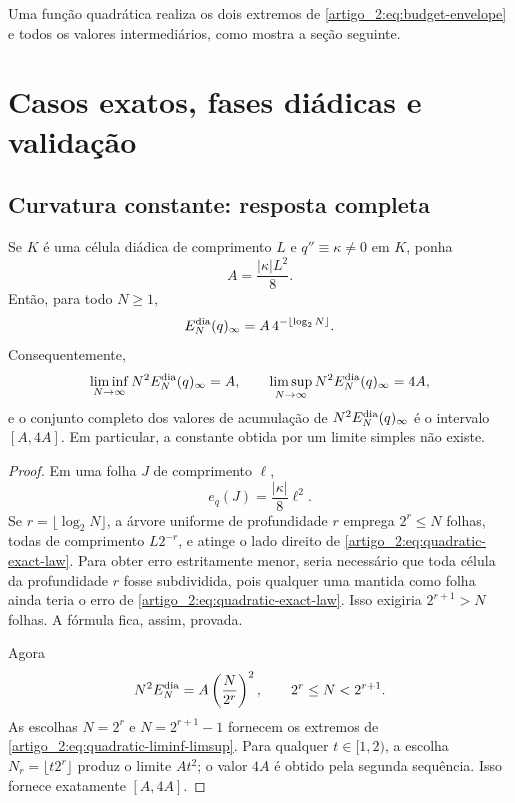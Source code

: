 Uma função quadrática realiza os dois extremos de \eqref{artigo_2:eq:budget-envelope} e todos os valores intermediários, como mostra a seção seguinte.

\section{Casos exatos, fases diádicas e validação}
\label{artigo_2:sec:dyadic-exact-cases}

\subsection{Curvatura constante: resposta completa}

\begin{theorem}\label{map:artigo_2:12.1}
\label{artigo_2:thm:quadratic-dyadic-constant}
Se $K$ é uma célula diádica de comprimento $L$ e
$q''\equiv\kappa\ne0$ em $K$, ponha
\begin{equation}
 A=\frac{|\kappa|L^2}{8}.
 \label{artigo_2:eq:quadratic-A}
\end{equation}
Então, para todo $N\ge1$,
\begin{equation}
 E_N^{\rm dia}(q)_\infty
 =A\,4^{-\lfloor\log_2N\rfloor}.
 \label{artigo_2:eq:quadratic-exact-law}
\end{equation}
Consequentemente,
\begin{equation}
 \liminf_{N\to\infty}N^2E_N^{\rm dia}(q)_\infty=A,
 \qquad
 \limsup_{N\to\infty}N^2E_N^{\rm dia}(q)_\infty=4A,
 \label{artigo_2:eq:quadratic-liminf-limsup}
\end{equation}
e o conjunto completo dos valores de acumulação de
$N^2E_N^{\rm dia}(q)_\infty$ é o intervalo $[A,4A]$. Em particular, a
constante obtida por um limite simples não existe.
\end{theorem}

\begin{proof}
Em uma folha $J$ de comprimento $\ell$,
\begin{equation}
 e_q(J)=\frac{|\kappa|}{8}\ell^2.
 \label{artigo_2:eq:quadratic-local-exact}
\end{equation}
Se $r=\lfloor\log_2N\rfloor$, a árvore uniforme de profundidade $r$ emprega
$2^r\le N$ folhas, todas de comprimento $L2^{-r}$, e atinge o lado direito
de \eqref{artigo_2:eq:quadratic-exact-law}. Para obter erro estritamente menor, seria
necessário que toda célula da profundidade $r$ fosse subdividida, pois
qualquer uma mantida como folha ainda teria o erro de
\eqref{artigo_2:eq:quadratic-exact-law}. Isso exigiria $2^{r+1}>N$ folhas. A fórmula
fica, assim, provada.

Agora
\[
 N^2E_N^{\rm dia}=A\left(\frac{N}{2^r}\right)^2,
 \qquad 2^r\le N<2^{r+1}.
\]
As escolhas $N=2^r$ e $N=2^{r+1}-1$ fornecem os extremos de
\eqref{artigo_2:eq:quadratic-liminf-limsup}. Para qualquer $t\in[1,2)$, a escolha
$N_r=\lfloor t2^r\rfloor$ produz o limite $At^2$; o valor $4A$ é obtido
pela segunda sequência. Isso fornece exatamente $[A,4A]$.
\end{proof}

